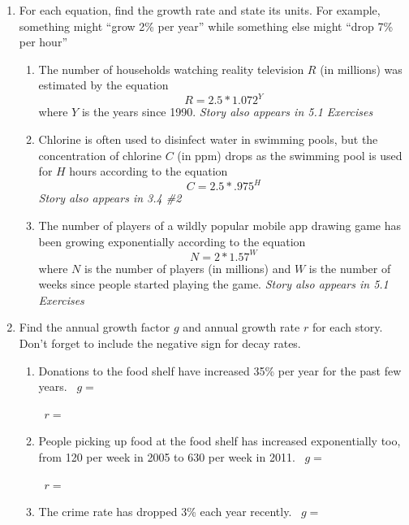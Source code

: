 \begin{enumerate}
\newpage %

\item For each equation, find the growth rate and state its units. For example, something might ``grow 2\% per year'' while something else might ``drop 7\% per hour''  %
\begin{enumerate} 
\item The number of households watching reality television $R$ (in millions) was estimated by the equation $$R=2.5 \ast 1.072^Y$$ where $Y$ is the years since 1990. 
\hfill \emph{Story also appears in 5.1 Exercises} \vfill
\item Chlorine is often used to disinfect water in swimming pools, but  the concentration of chlorine $C$ (in ppm) drops as the swimming pool is used for $H$ hours according to the equation $$C = 2.5 \ast .975^H$$ 
 \hfill  \emph{Story also appears in 3.4 \#2} \vfill
 
 \item The number of players of a wildly popular mobile app drawing game  has been growing exponentially according to the equation $$N = 2 \ast 1.57^W$$ where $N$ is the number of players (in millions) and $W$ is the number of weeks since people started playing the game.
 \hfill \emph{Story also appears in 5.1 Exercises} \vfill
 
\end{enumerate}

\newpage %

\item Find the annual growth factor $g$ and annual growth rate $r$ for each story.  Don't forget to include the negative sign for decay rates.
\begin{enumerate}
\item  Donations to the food shelf have increased 35\% per year for the past few years. 
\vfill
~\hfill $g=$ \hspace{1in} 

~\hfill $r=$ \hspace{1in} 
\vfill
\item  People picking up food at the food shelf has increased exponentially too, from 120 per week in 2005 to 630 per week in 2011. \vfill
~\hfill $g=$ \hspace{1in} 

~\hfill $r=$ \hspace{1in} 
\vfill
\item The crime rate has dropped 3\% each year recently. \vfill
~\hfill $g=$ \hspace{1in} 


\end{enumerate}
\end{enumerate}
